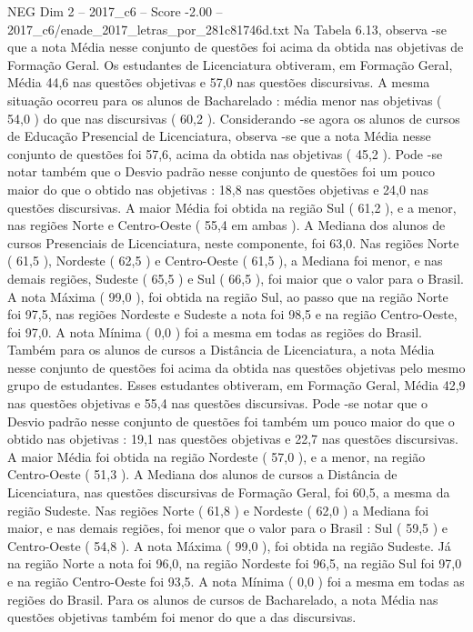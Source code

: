 \begin{textsample}{NEG Dim 2 – 2017\_c6 – Score -2.00 – 2017\_c6/enade\_2017\_letras\_por\_281c81746d.txt}
Na Tabela 6.13, observa -se que a nota Média nesse conjunto de questões foi acima da obtida nas objetivas de Formação Geral.
Os estudantes de Licenciatura obtiveram, em Formação Geral, Média 44,6 nas questões objetivas e 57,0 nas questões discursivas.
A mesma situação ocorreu para os alunos de Bacharelado : média menor nas objetivas ( 54,0 ) do que nas discursivas ( 60,2 ).
Considerando -se agora os alunos de cursos de Educação Presencial de Licenciatura, observa -se que a nota Média nesse conjunto de questões foi 57,6, acima da obtida nas objetivas ( 45,2 ).
Pode -se notar também que o Desvio padrão nesse conjunto de questões foi um pouco maior do que o obtido nas objetivas : 18,8 nas questões objetivas e 24,0 nas questões discursivas.
A maior Média foi obtida na região Sul ( 61,2 ), e a menor, nas regiões Norte e Centro-Oeste ( 55,4 em ambas ).
A Mediana dos alunos de cursos Presenciais de Licenciatura, neste componente, foi 63,0.
Nas regiões Norte ( 61,5 ), Nordeste ( 62,5 ) e Centro-Oeste ( 61,5 ), a Mediana foi menor, e nas demais regiões, Sudeste ( 65,5 ) e Sul ( 66,5 ), foi maior que o valor para o Brasil.
A nota Máxima ( 99,0 ), foi obtida na região Sul, ao passo que na região Norte foi 97,5, nas regiões Nordeste e Sudeste a nota foi 98,5 e na região Centro-Oeste, foi 97,0.
A nota Mínima ( 0,0 ) foi a mesma em todas as regiões do Brasil.
Também para os alunos de cursos a Distância de Licenciatura, a nota Média nesse conjunto de questões foi acima da obtida nas questões objetivas pelo mesmo grupo de estudantes.
Esses estudantes obtiveram, em Formação Geral, Média 42,9 nas questões objetivas e 55,4 nas questões discursivas.
Pode -se notar que o Desvio padrão nesse conjunto de questões foi também um pouco maior do que o obtido nas objetivas : 19,1 nas questões objetivas e 22,7 nas questões discursivas.
A maior Média foi obtida na região Nordeste ( 57,0 ), e a menor, na região Centro-Oeste ( 51,3 ).
A Mediana dos alunos de cursos a Distância de Licenciatura, nas questões discursivas de Formação Geral, foi 60,5, a mesma da região Sudeste.
Nas regiões Norte ( 61,8 ) e Nordeste ( 62,0 ) a Mediana foi maior, e nas demais regiões, foi menor que o valor para o Brasil : Sul ( 59,5 ) e Centro-Oeste ( 54,8 ).
A nota Máxima ( 99,0 ), foi obtida na região Sudeste.
Já na região Norte a nota foi 96,0, na região Nordeste foi 96,5, na região Sul foi 97,0 e na região Centro-Oeste foi 93,5.
A nota Mínima ( 0,0 ) foi a mesma em todas as regiões do Brasil.
Para os alunos de cursos de Bacharelado, a nota Média nas questões objetivas também foi menor do que a das discursivas.

\end{textsample}
